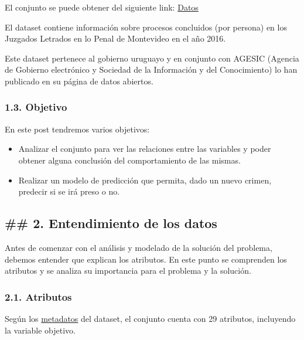 \documentclass[11pt]{article}
\providecommand{\tightlist}{%
      \setlength{\itemsep}{0pt}\setlength{\parskip}{0pt}}
\begin{document}
El conjunto se puede obtener del siguiente link:
\href{https://catalogodatos.gub.uy/dataset/72a5f9be-591d-415d-9428-970336f5e50d/resource/7ae84c9c-d04e-4e16-ba94-5e90da5cdf5e/download/basepenal2016.csv}{Datos}

El dataset contiene información sobre procesos concluidos (por persona)
en los Juzgados Letrados en lo Penal de Montevideo en el año 2016.

Este dataset pertenece al gobierno uruguayo y en conjunto con AGESIC
(Agencia de Gobierno electrónico y Sociedad de la Información y del
Conocimiento) lo han publicado en su página de datos abiertos.

    \subsubsection{1.3. Objetivo }\label{objetivo}

En este post tendremos varios objetivos:

\begin{itemize}
\tightlist
\item
  Analizar el conjunto para ver las relaciones entre las variables y
  poder obtener alguna conclusión del comportamiento de las mismas.
\item
  Realizar un modelo de predicción que permita, dado un nuevo crimen,
  predecir si se irá preso o no.
\end{itemize}

    \subsection{\#\# 2. Entendimiento de los datos
}\label{entendimiento-de-los-datos}

Antes de comenzar con el análisis y modelado de la solución del
problema, debemos entender que explican los atributos. En este punto se
comprenden los atributos y se analiza su importancia para el problema y
la solución.

    \subsubsection{2.1. Atributos }\label{atributos}

Según los
\href{https://catalogodatos.gub.uy/dataset/72a5f9be-591d-415d-9428-970336f5e50d/resource/25af959a-6a27-41c1-a762-6fbba24866a4/download/metadatapenal2016.json}{metadatos}
del dataset, el conjunto cuenta con 29 atributos, incluyendo la variable
objetivo.
\end{document}

